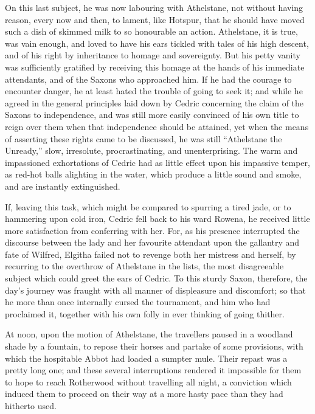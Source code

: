 On this last subject, he was now labouring with Athelstane, not without
having reason, every now and then, to lament, like Hotspur, that he
should have moved such a dish of skimmed milk to so honourable an
action. Athelstane, it is true, was vain enough, and loved to have his
ears tickled with tales of his high descent, and of his right by
inheritance to homage and sovereignty. But his petty vanity was
sufficiently gratified by receiving this homage at the hands of his
immediate attendants, and of the Saxons who approached him. If he had
the courage to encounter danger, he at least hated the trouble of going
to seek it; and while he agreed in the general principles laid down by
Cedric concerning the claim of the Saxons to independence, and was still
more easily convinced of his own title to reign over them when that
independence should be attained, yet when the means of asserting these
rights came to be discussed, he was still ``Athelstane the Unready,''
slow, irresolute, procrastinating, and unenterprising. The warm and
impassioned exhortations of Cedric had as little effect upon his
impassive temper, as red-hot balls alighting in the water, which produce
a little sound and smoke, and are instantly extinguished.

If, leaving this task, which might be compared to spurring a tired jade,
or to hammering upon cold iron, Cedric fell back to his ward Rowena, he
received little more satisfaction from conferring with her. For, as his
presence interrupted the discourse between the lady and her favourite
attendant upon the gallantry and fate of Wilfred, Elgitha failed not to
revenge both her mistress and herself, by recurring to the overthrow of
Athelstane in the lists, the most disagreeable subject which could greet
the ears of Cedric. To this sturdy Saxon, therefore, the day's journey
was fraught with all manner of displeasure and discomfort; so that he
more than once internally cursed the tournament, and him who had
proclaimed it, together with his own folly in ever thinking of going
thither.

At noon, upon the motion of Athelstane, the travellers paused in a
woodland shade by a fountain, to repose their horses and partake of some
provisions, with which the hospitable Abbot had loaded a sumpter mule.
Their repast was a pretty long one; and these several interruptions
rendered it impossible for them to hope to reach Rotherwood without
travelling all night, a conviction which induced them to proceed on
their way at a more hasty pace than they had hitherto used.
